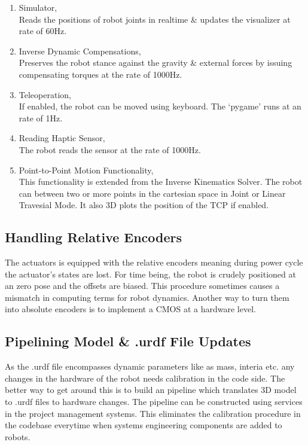 \documentclass[12pt]{article}
\begin{document}
    \begin{enumerate}
        \item Simulator,\\
        Reads the positions of robot joints in realtime \& updates the visualizer at rate of 60Hz.

        \item Inverse Dynamic Compensations,\\
        Preserves the robot stance against the gravity \& external forces by issuing compensating torques at the rate of 1000Hz.
        
        \item Teleoperation,\\
        If enabled, the robot can be moved using keyboard. The `pygame' runs at an rate of 1Hz.

        \item Reading Haptic Sensor,\\
        The robot reads the sensor at the rate of 1000Hz.

        \item Point-to-Point Motion Functionality,\\
        This functionality is extended from the Inverse Kinematics Solver. The robot can between two or more points in the cartesian space in Joint or Linear Travesial Mode.
        It also 3D plots the position of the TCP if enabled.
    \end{enumerate}

    \subsection{Handling Relative Encoders}
        The actuators is equipped with the relative encoders meaning during power cycle the actuator's states are lost.
        For time being, the robot is crudely positioned at an zero pose and the offsets are biased.
        This procedure sometimes causes a mismatch in computing terms for robot dynamics.
        Another way to turn them into absolute encoders is to implement a CMOS at a hardware level.

    \subsection{Pipelining Model \& .urdf File Updates}
        As the .urdf file encompasses dynamic parameters like as mass, interia etc. any changes in the hardware of the robot needs calibration in the code side.
        The better way to get around this is to build an pipeline which translates 3D model to .urdf files to hardware changes.
        The pipeline can be constructed using services in the project management systems.
        This eliminates the calibration procedure in the codebase everytime when systems engineering components are added to robots.  
    \pagebreak
\end{document}
